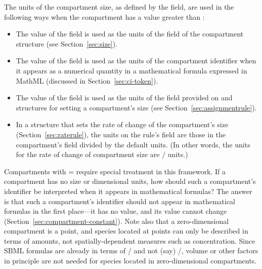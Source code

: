 The units of the compartment size, as defined by the 
field, are used in the following ways when the compartment has a
 value greater than :
\begin{itemize}

\item The value of the  field is used as the units of
  the  field of the compartment structure (see
  Section~\ref{sec:size}).

\item The value of the  field is used as the units of
  the compartment identifier when it appears as a numerical
  quantity in a mathematical formula expressed in MathML
  (discussed in Section~\ref{sec:ci-token}).

\item The value of the  field is used as the units of
  the  field provided on \AssignmentRule and
    \InitialAssignment structures for setting a compartment's
    size (see Section~\ref{sec:assignmentrule}).

\item In a \RateRule structure that sets the rate of change of the
  compartment's size (Section~\ref{sec:raterule}), the units on
  the rule's  field are those in the compartment's
   field divided by the default 
  units.  (In other words, the units for the rate of change of
  compartment size are /
  units.)

\end{itemize}

Compartments with = require
special treatment in this framework.  If a compartment has no size
or dimensional units, how should such a compartment's identifier
be interpreted when it appears in mathematical formulas?  The
answer is that such a compartment's identifier should not appear
in mathematical formulas in the first place---it has no value, and
its value cannot change (Section~\ref{sec:compartment-constant}).
Note also that a zero-dimensional compartment is a point, and
species located at points can only be described in terms of
amounts, not spatially-dependent measures such as concentration.
Since SBML \KineticLaw formulas are already in terms of
/ and not (say)
/, volume or other factors
in principle are not needed for species located in
zero-dimensional compartments.


